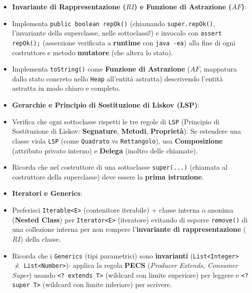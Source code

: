 \begin{itemize}
\item \textbf{Invariante di Rappresentazione ($RI$) e Funzione di Astrazione ($AF$)}:

\item Implementa \texttt{public boolean repOk()} (chiamando \texttt{super.repOk()}, l'invariante della superclasse, nelle sottoclassi!) e invocalo con \texttt{assert repOk();} (asserzione verificata a \textbf{runtime} con \texttt{java -ea}) alla fine di ogni costruttore e metodo \textbf{mutatore} (che altera lo stato).



\item Implementa \texttt{toString()} come \textbf{Funzione di Astrazione} ($AF$, mappatura dallo stato concreto nello \texttt{Heap} all'entità astratta) descrivendo l'entità astratta in modo chiaro e completo.



\item \textbf{Gerarchie e Principio di Sostituzione di Liskov (LSP)}:

\item Verifica che ogni sottoclasse rispetti le tre regole di \texttt{LSP} (Principio di Sostituzione di Liskov: \textbf{Segnature}, \textbf{Metodi}, \textbf{Proprietà}). Se estendere una classe viola \texttt{LSP} (come \texttt{Quadrato} vs \texttt{Rettangolo}), usa \textbf{Composizione} (attributo privato interno) e \textbf{Delega} (inoltro delle chiamate).



\item Ricorda che nel costruttore di una sottoclasse \texttt{super(...)} (chiamata al costruttore della superclasse) deve essere la \textbf{prima istruzione}.



\item \textbf{Iteratori e Generics}:

\item Preferisci \texttt{Iterable<E>} (contenitore iterabile) + classe interna o anonima (\textbf{Nested Class}) per \texttt{Iterator<E>} (iteratore) evitando di esporre \texttt{remove()} di una collezione interna per non rompere l'\textbf{invariante di rappresentazione} ($RI$) della classe.



\item Ricorda che i \texttt{Generics} (tipi parametrici) sono \textbf{invarianti} (\texttt{List<Integer>} $\not\prec$ \texttt{List<Number>}): applica la regola \textbf{PECS} (\emph{Producer Extends, Consumer Super}) usando \texttt{<? extends T>} (wildcard con limite superiore) per leggere e \texttt{<? super T>} (wildcard con limite inferiore) per scrivere.

\end{itemize}
